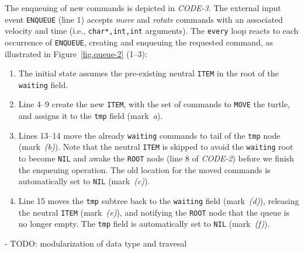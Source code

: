 \documentclass{sig-alternate}
\newcommand{\code}[1] {{\small{\texttt{#1}}}}
\begin{document}
The enqueuing of new commands is depicted in \emph{CODE-3}.
The external input event \code{ENQUEUE} (line 1) accepts \emph{move} and 
\emph{rotate} commands with an associated velocity and time (i.e., 
\code{char*,int,int} arguments).
The \code{every} loop reacts to each occurrence of \code{ENQUEUE}, creating and 
enqueuing the requested command, as illustrated in Figure~\ref{fig.queue-2} 
(1--3):
%
\begin{enumerate}[start=0]
%
\item The initial state assumes the pre-existing neutral \code{ITEM} in the 
root of the \code{waiting} field.
%
\item Line 4--9 create the new \code{ITEM}, with the set of commands to 
\code{MOVE} the turtle, and assigns it to the \code{tmp} field (mark~\emph{a}).
%
\item Lines 13--14 move the already \code{waiting} commands to tail of the 
\code{tmp} node (mark~\emph{(b)}).
Note that the neutral \code{ITEM} is skipped to avoid the \code{waiting} root 
to become \code{NIL} and awake the \code{ROOT} node (line 8 of \emph{CODE-2}) 
before we finish the enqueuing operation.
The old location for the moved commands is automatically set to \code{NIL} 
(mark~\emph{(c)}).
%
\item Line 15 moves the \code{tmp} subtree back to the \code{waiting} field 
(mark~\emph{(d)}), releasing the neutral \code{ITEM} (mark~\emph{(e)}), and 
notifying the \code{ROOT} node that the queue is no longer empty.
The \code{tmp} field is automatically set to \code{NIL} (mark~\emph{(f)}).
%
\end{enumerate}
%

- TODO: modularization of data type and travesal
\end{document}
